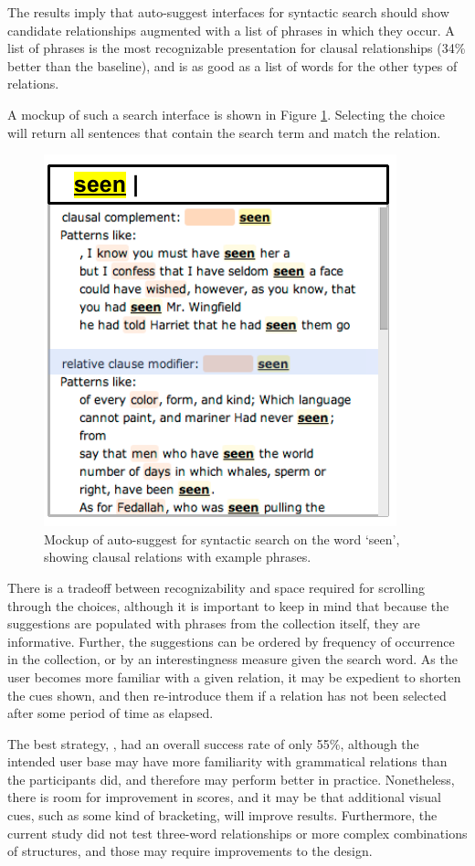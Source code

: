 

The results imply that auto-suggest interfaces for syntactic search should show candidate relationships augmented with a list of phrases in which they occur. A list of phrases is the most recognizable presentation for clausal relationships (34\% better than the baseline), and is as good as a list of words for the other types of relations.

A mockup of such a search interface is shown in Figure \ref{fig:phrases-mockup}.  Selecting the choice will return all sentences that contain the search term and match the relation.
\begin{figure}
\centering
\includegraphics[width=0.5\columnwidth]{fig/phrases-mockup}
\caption{
	\label{fig:phrases-mockup} Mockup of auto-suggest for syntactic search on the word `seen', showing clausal relations with example phrases.
}
\end{figure}

There is a tradeoff between recognizability and space required for scrolling through the choices, although it is important to keep in mind that because the suggestions are populated with phrases from the collection itself, they are informative.    Further, the suggestions can be ordered by frequency of occurrence in the collection, or by an interestingness measure given the search word.  As the user becomes more familiar with a given relation, it may  be expedient to shorten the cues shown, and then re-introduce them if a relation has not been selected after some period of time as elapsed.

The best  strategy, , had an overall success rate of only 55\%, although the intended user base may have more familiarity with grammatical relations than the participants did, and therefore may perform better in practice.  Nonetheless, there is room for improvement in scores, and it may be that additional visual cues, such as some kind of bracketing, will improve results.  Furthermore, the current study did not test three-word relationships or more complex combinations of structures, and those may require improvements to the design.
